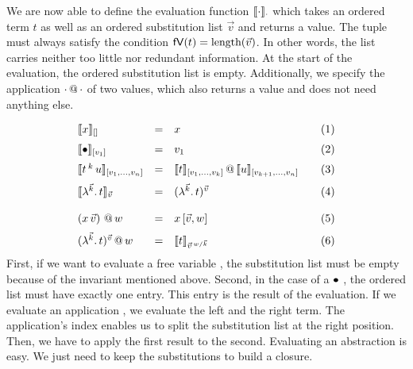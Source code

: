 \documentclass[submission,copyright,creativecommons]{eptcs}
\begin{document}
We are now able to define the evaluation function $\llbracket{\cdot}\rrbracket_{\cdot}$ which takes an ordered term $t$ as well as an ordered substitution list $\vec v$ and returns a value. The tuple must always satisfy the condition $\mathsf{fV}(t) = \mbox{length}(\vec v)$. In other words, the list carries neither too little nor redundant information.
At the start of the evaluation, the ordered substitution list is empty. 
Additionally, we specify the application $\cdot \,@\, \cdot$ of two values, which also returns a value and does not need anything else.

\[ 
\begin{array}{lcl@{\qquad} r}
 \ev x {\emptyVec} & = & x & \lab 1 \\ \noalign{\medskip}
 \ev \ovar {\ve{v_1}} & = & v_1 & \lab 2\\  \noalign{\medskip}
 \ev {t \oapp k u} {\ve{v_1, \ldots, v_n}} & = & {\ev t {\ve{v_1, \ldots, v_k}}} \ap {\ev u {\ve{v_{k+1}, \ldots, v_n}}}  & \lab 3 \\  \noalign{\medskip}
 \ev {\LaO {\vec k} t}  {\vec v} & = & \Val {\vec k} t {\vec v} & \lab 4 \\  
\\ 
 \pa{x \sspace \vec v} \ap w & = & x \sspace \ve{\vec v, w}  & \lab 5
\\ \noalign{\medskip}
 \Val{\vec k} t {\vec v}   \ap w & = & \ev t {\multiinsert{\vec v}{\vec k}{w}} & \lab 6
\end{array}
\]
First, if we want to evaluate a free variable , the substitution list must be empty because of the invariant mentioned above. 
Second, in the case of a $\mathord{\bullet}$ , the ordered list must have exactly one entry. This entry is the result of the evaluation. 
If we evaluate an application , we evaluate the left and the right term. The application's index enables us to split the substitution list at the right position. Then, we have to apply the first result to the second. 
Evaluating an abstraction  is easy. We just need to keep the substitutions to build a closure. 
\end{document}
